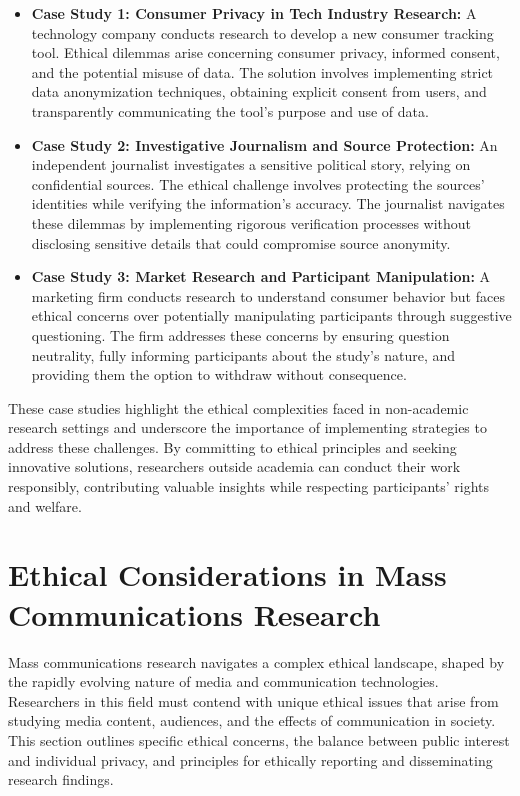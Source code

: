 \documentclass[
]{book}
\begin{document}
\begin{itemize}
\item
  \textbf{Case Study 1: Consumer Privacy in Tech Industry Research:} A technology company conducts research to develop a new consumer tracking tool. Ethical dilemmas arise concerning consumer privacy, informed consent, and the potential misuse of data. The solution involves implementing strict data anonymization techniques, obtaining explicit consent from users, and transparently communicating the tool's purpose and use of data.
\item
  \textbf{Case Study 2: Investigative Journalism and Source Protection:} An independent journalist investigates a sensitive political story, relying on confidential sources. The ethical challenge involves protecting the sources' identities while verifying the information's accuracy. The journalist navigates these dilemmas by implementing rigorous verification processes without disclosing sensitive details that could compromise source anonymity.
\item
  \textbf{Case Study 3: Market Research and Participant Manipulation:} A marketing firm conducts research to understand consumer behavior but faces ethical concerns over potentially manipulating participants through suggestive questioning. The firm addresses these concerns by ensuring question neutrality, fully informing participants about the study's nature, and providing them the option to withdraw without consequence.
\end{itemize}

These case studies highlight the ethical complexities faced in non-academic research settings and underscore the importance of implementing strategies to address these challenges. By committing to ethical principles and seeking innovative solutions, researchers outside academia can conduct their work responsibly, contributing valuable insights while respecting participants' rights and welfare.

\hypertarget{ethical-considerations-in-mass-communications-research}{%
\section{Ethical Considerations in Mass Communications Research}\label{ethical-considerations-in-mass-communications-research}}

Mass communications research navigates a complex ethical landscape, shaped by the rapidly evolving nature of media and communication technologies. Researchers in this field must contend with unique ethical issues that arise from studying media content, audiences, and the effects of communication in society. This section outlines specific ethical concerns, the balance between public interest and individual privacy, and principles for ethically reporting and disseminating research findings.
\end{document}

